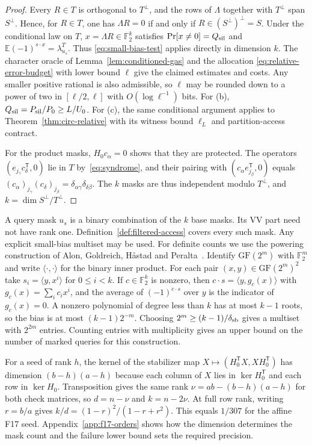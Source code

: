 \documentclass[10pt,twocolumn]{article}
\theoremstyle{definition}
\newcommand{\Ftwo}{\mathbb{F}_2}
\begin{document}
\begin{proof}
Every $R\in T$ is orthogonal to $T^\perp$, and the rows of $\Lambda$
together with $T^\perp$ span $S^\perp$. Hence, for $R\in T$, one has
$\Lambda R=0$ if and only if $R\in(S^\perp)^\perp=S$.
Under the conditional law on $T$,
$x=\Lambda R\in\Ftwo^k$ satisfies $\Pr[x\ne0]=Q_{\rm sil}$ and
$\mathbb E(-1)^{s\cdot x}=\lambda^T_{u_s}$. Thus
\eqref{eq:small-bias-test} applies directly in dimension $k$.
The character oracle of Lemma~\ref{lem:conditioned-gas} and the allocation
\eqref{eq:relative-error-budget} with lower bound $\ell$ give the
claimed estimates and costs.
Any smaller positive rational is also admissible, so $\ell$ may be
rounded down to a power of two in $[\ell/2,\ell]$ with
$O(\log\ell^{-1})$ bits. For (b), $Q_{\rm sil}=P_{\rm sil}/P_0\ge L/U_0$.
For (c), the same conditional argument applies to
Theorem~\ref{thm:circ-relative} with its witness bound $\ell_L$ and
partition-access contract.

For the product masks, $H_0c_\alpha=0$ shows that they are protected.
The operators $(e_{j_\gamma}c_\delta^{\mathsf T},0)$ lie in $T$
by~\eqref{eq:syndrome}, and their pairing with
$(c_\alpha e_{j_\beta}^{\mathsf T},0)$ equals
$(c_\alpha)_{j_\gamma}(c_\delta)_{j_\beta}
=\delta_{\alpha\gamma}\delta_{\delta\beta}$.
The $k$ masks are thus independent modulo $T^\perp$, and
$k=\dim S^\perp/T^\perp$.
\end{proof}

A query mask $u_s$ is a binary combination of the $k$ base masks. Its
VV part need not have rank one. Definition~\ref{def:filtered-access}
covers every such mask.
Any explicit small-bias multiset may be used. For definite counts we
use the powering construction of Alon, Goldreich, H{\aa}stad and
Peralta~\cite{AGHP92}. Identify $\mathrm{GF}(2^m)$ with $\Ftwo^m$ and
write $\langle\cdot,\cdot\rangle$ for the binary inner product. For each
pair $(x,y)\in\mathrm{GF}(2^m)^2$ take $s_i=\langle y,x^i\rangle$ for
$0\le i<k$. If $c\in\Ftwo^k$ is nonzero, then
$c\cdot s=\langle y,g_c(x)\rangle$ with $g_c(x)=\sum_ic_ix^i$, and the
average of $(-1)^{c\cdot s}$ over $y$ is the indicator of $g_c(x)=0$.
A nonzero polynomial of degree less than $k$ has at most $k-1$ roots,
so the bias is at most $(k-1)2^{-m}$. Choosing
$2^m\ge(k-1)/\delta_{\rm sb}$ gives a multiset with $2^{2m}$ entries.
Counting entries with multiplicity gives an upper bound on the number
of marked queries for this construction.

For a seed of rank $h$, the kernel of the stabilizer map
$X\mapsto(H_0^{\mathsf T}X,XH_0^{\mathsf T})$ has dimension
$(b-h)(a-h)$ because each column of $X$ lies in $\ker H_0^{\mathsf T}$
and each row in $\ker H_0$. Transposition gives the same rank
$\nu=ab-(b-h)(a-h)$ for both check matrices, so $d=n-\nu$ and
$k=n-2\nu$. At full row rank, writing $r=b/a$ gives
$k/d=(1-r)^2/(1-r+r^2)$. This equals $1/307$ for the affine F17 seed.
Appendix~\ref{app:f17-orders} shows how the dimension determines the
mask count and the failure lower bound sets the required precision.
\end{document}
